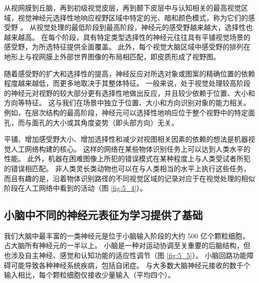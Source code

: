 从视网膜到丘脑，再到初级视觉皮层，再到颞下皮层中与认知相关的最高视觉区域，视觉神经元选择性地响应视野区域中特定的光、暗和颜色模式，称为它们的感受野 。
从视觉处理的最低阶段到最高阶段，神经元的感受野越来越大，选择性也越来越高。
在每个阶段，具有特定类型选择性的神经元往往具有平铺视觉场景的感受野，为所选特征提供全面覆盖。 
此外，每个视觉大脑区域中感受野的排列在地形上与视网膜上外部世界图像的布局相匹配，即皮质形成了视野图。


随着感受野的扩大和选择性的提高，神经反应对所选对象或图案的精确位置的依赖程度越来越低，而更多地取决于其整体特征。
一般来说，处于视觉处理较高阶段的神经元对视野的较大部分更有选择性地做出反应，并且较少依赖于位置、大小和方向等特征。 
这与我们在场景中独立于位置、大小和方向识别对象的能力相关。 
例如，在层次结构的最高阶段，神经元可以选择性地响应位于整个视野中的特定面孔，而与面孔的大小或其角度姿势（即头部方向）无关。


平铺、增加感受野大小、增加选择性和减少对视图相关因素的依赖的想法是机器视觉人工网络构建的核心。 
这样的网络在某些物体识别任务上可以达到人类水平的性能。 
此外，机器在困难图像上所犯的错误模式在某种程度上与人类受试者所犯的错误相匹配。 
非人类灵长类动物也可以在与人类相当的水平上执行这些任务，而且有趣的是，沿着物体识别路径的不同视觉区域的记录对应于在视觉处理的相似阶段在人工网络中看到的活动（图 \ref{fig:5_4}）。


\subsection{小脑中不同的神经元表征为学习提供了基础}
我们大脑中最丰富的一类神经元是位于小脑输入阶段的大约 500 亿个颗粒细胞，占大脑所有神经元的一半以上。 
小脑是一种对运动协调至关重要的后脑结构，但也涉及自主神经、感觉和认知功能的适应性调节（图 \ref{fig:5_5}）。 
小脑回路功能障碍可能导致各种神经系统疾病，包括自闭症。 
与大多数大脑神经元接收的数千个输入相比，每个颗粒细胞仅接收少量输入（平均四个）。

